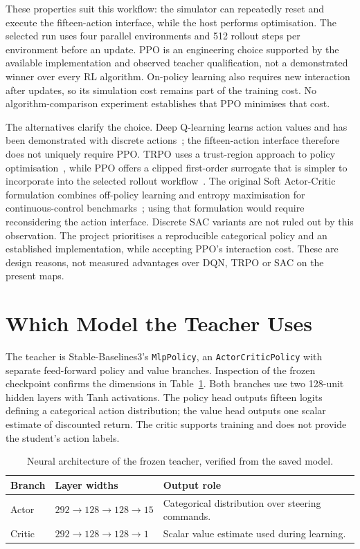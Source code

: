 These properties suit this workflow: the simulator can repeatedly reset and
execute the fifteen-action interface, while the host performs optimisation.
The selected run uses four parallel environments and 512 rollout steps per
environment before an update. PPO is an engineering choice supported by the
available implementation and observed teacher qualification, not a demonstrated
winner over every RL algorithm. On-policy learning also requires new interaction
after updates, so its simulation cost remains part of the training cost.
No algorithm-comparison experiment establishes that PPO minimises that cost.

The alternatives clarify the choice. Deep Q-learning learns action values and
has been demonstrated with discrete actions~\cite{mnih2013playing}; the
fifteen-action interface therefore does not uniquely require PPO. TRPO uses a
trust-region approach to policy optimisation~\cite{schulman2015trpo}, while
PPO offers a clipped first-order surrogate that is simpler to incorporate into
the selected rollout workflow~\cite{schulman2017ppo}. The original Soft
Actor-Critic formulation combines off-policy learning and entropy maximisation
for continuous-control benchmarks~\cite{haarnoja2018sac}; using that formulation
would require reconsidering the action interface. Discrete SAC variants are
not ruled out by this observation. The project prioritises a reproducible
categorical policy and an established implementation, while accepting PPO's
interaction cost. These are design reasons, not measured advantages over DQN,
TRPO or SAC on the present maps.

\section{Which Model the Teacher Uses}
The teacher is Stable-Baselines3's \texttt{MlpPolicy}, an
\texttt{ActorCriticPolicy} with separate feed-forward policy and value branches.
Inspection of the frozen checkpoint confirms the dimensions in
Table~\ref{tab:teacher_network}. Both branches use two 128-unit hidden layers
with Tanh activations. The policy head outputs fifteen logits defining a
categorical action distribution; the value head outputs one scalar estimate
of discounted return. The critic supports training and does not provide the
student's action labels.

\begin{table}[htbp]
\centering\small
\caption{Neural architecture of the frozen teacher, verified from the saved model.}
\label{tab:teacher_network}
\begin{tabularx}{\textwidth}{l l >{\raggedright\arraybackslash}X}
\toprule Branch & Layer widths & Output role \\\midrule
Actor & $292\to128\to128\to15$ & Categorical distribution over steering commands. \\
Critic & $292\to128\to128\to1$ & Scalar value estimate used during learning. \\
\bottomrule
\end{tabularx}
\end{table}

